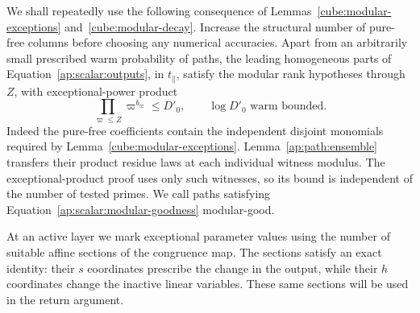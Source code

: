 We shall repeatedly use the following consequence of
Lemmas~\ref{cube:modular-exceptions} and~\ref{cube:modular-decay}.
Increase the structural number of pure-free columns before choosing
any numerical accuracies. Apart from an arbitrarily small prescribed
warm probability of paths, the leading homogeneous parts of
Equation~\eqref{ap:scalar:outputs}, in $t_\parallel$, satisfy the modular
rank hypotheses through $Z$, with exceptional-power product
\begin{equation}\label{ap:scalar:modular-goodness}
              \prod_{\varpi\le Z}\varpi^{b_\varpi}\le D'_0,
              \qquad \log D'_0\text{ warm bounded}.
\end{equation}
Indeed the pure-free coefficients contain the independent disjoint
monomials required by Lemma~\ref{cube:modular-exceptions}.
Lemma~\ref{ap:path:ensemble} transfers their product residue laws at
each individual witness modulus. The exceptional-product proof uses
only such witnesses, so its bound is independent of the number of
tested primes. We call paths satisfying
Equation~\eqref{ap:scalar:modular-goodness} modular-good.

At an active layer we mark exceptional parameter values using the
number of suitable affine sections of the congruence map. The
sections satisfy an exact identity: their $s$ coordinates prescribe
the change in the output, while their $h$ coordinates change the
inactive linear variables. These same sections will be used in the
return argument.

